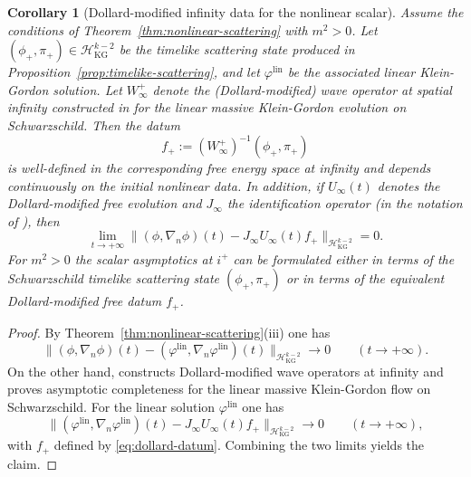 \documentclass[11pt]{article}
\numberwithin{equation}{section}
\theoremstyle{plain}
\newtheorem{corollary}[theorem]{Corollary}
\theoremstyle{definition}
\theoremstyle{remark}
\begin{document}
\begin{corollary}[Dollard-modified infinity data for the nonlinear scalar]\label{cor:dollard}
Assume the conditions of Theorem~\ref{thm:nonlinear-scattering} with $m^{2}>0$.
Let $(\phi_{+},\pi_{+})\in\mathcal H_{\mathrm{KG}}^{k-2}$ be the timelike scattering state produced in Proposition~\ref{prop:timelike-scattering}, and let $\varphi^{\mathrm{lin}}$ be the associated linear Klein-Gordon solution.
Let $W_{\infty}^{+}$ denote the (Dollard-modified) wave operator at spatial infinity constructed in \cite{BachelotKG} for the linear massive Klein-Gordon evolution on Schwarzschild.
Then the datum
\begin{equation}\label{eq:dollard-datum}
f_{+}:=(W_{\infty}^{+})^{-1}(\phi_{+},\pi_{+})
\end{equation}
is well-defined in the corresponding free energy space at infinity and depends continuously on the initial nonlinear data.
In addition, if $U_{\infty}(t)$ denotes the Dollard-modified free evolution and $J_{\infty}$ the identification operator (in the notation of \cite{BachelotKG}), then
\begin{equation}
\lim_{t\to+\infty}
\bigl\|(\phi,\nabla_{n}\phi)(t)-J_{\infty}U_{\infty}(t)f_{+}\bigr\|_{\mathcal H_{\mathrm{KG}}^{k-2}}=0.
\end{equation}
For $m^{2}>0$ the scalar asymptotics at $i^{+}$ can be formulated either in terms of the Schwarzschild timelike scattering state $(\phi_{+},\pi_{+})$ or in terms of the equivalent Dollard-modified free datum $f_{+}$.
\end{corollary}

\begin{proof}
By Theorem~\ref{thm:nonlinear-scattering}(iii) one has
\begin{equation}
\bigl\|(\phi,\nabla_{n}\phi)(t)-(\varphi^{\mathrm{lin}},\nabla_{n}\varphi^{\mathrm{lin}})(t)\bigr\|_{\mathcal H_{\mathrm{KG}}^{k-2}}\to0
\qquad (t\to+\infty).
\end{equation}
On the other hand, \cite{BachelotKG} constructs Dollard-modified wave operators at infinity and proves asymptotic completeness for the linear massive Klein-Gordon flow on Schwarzschild.
For the linear solution $\varphi^{\mathrm{lin}}$ one has
\begin{equation}
\bigl\|(\varphi^{\mathrm{lin}},\nabla_{n}\varphi^{\mathrm{lin}})(t)-J_{\infty}U_{\infty}(t)f_{+}\bigr\|_{\mathcal H_{\mathrm{KG}}^{k-2}}\to0
\qquad (t\to+\infty),
\end{equation}
with $f_{+}$ defined by \eqref{eq:dollard-datum}.
Combining the two limits yields the claim.
\end{proof}
\end{document}
